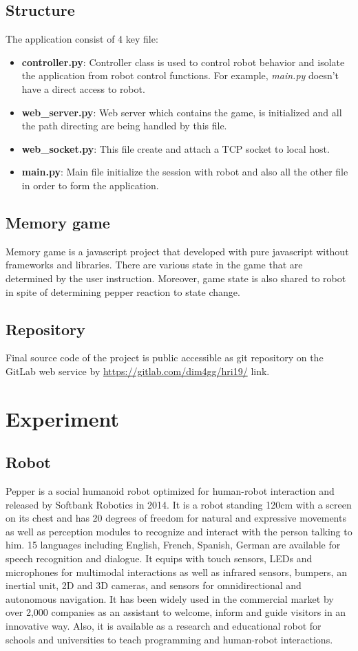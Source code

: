 \documentclass[12pt]{article}
\begin{document}
\subsection{Structure}
The application consist of 4 key file:
\begin{itemize}
\item \textbf{controller.py}: Controller class is used to control robot behavior and isolate the application from robot control functions. For example, \textit{main.py} doesn't have a direct access to robot.
\item \textbf{web\_server.py}: Web server which contains the game, is initialized and all the path directing are being handled by this file.
\item \textbf{web\_socket.py}: This file create and attach a TCP socket to local host.
\item \textbf{main.py}: Main file initialize the session with robot and also all the other file in order to form the application.
\end{itemize}
\subsection{Memory game}
Memory game is a javascript project that developed with pure javascript without frameworks and libraries. There are various state in the game that are determined by the user instruction. Moreover, game state is also shared to robot in spite of determining pepper reaction to state change.
\subsection{Repository}
Final source code of the project is public accessible as git repository on the GitLab web service by \url{https://gitlab.com/dim4gg/hri19/} link.
\newpage
\section{Experiment}
\label{sect_exper}

\subsection{Robot}
Pepper is a social humanoid robot optimized for human-robot interaction and released by Softbank Robotics in 2014. It is a robot standing 120cm with a screen on its chest and has 20 degrees of freedom for natural and expressive movements as well as perception modules to recognize and interact with the person talking to him. 15 languages including English, French, Spanish, German are available  for speech recognition and dialogue. It equips with touch sensors, LEDs and microphones for multimodal interactions as well as infrared sensors, bumpers, an inertial unit, 2D and 3D cameras, and sensors for omnidirectional and autonomous navigation. It has been widely used in the commercial market by over 2,000 companies as an assistant to welcome, inform and guide visitors in an innovative way. Also, it is available as a research and educational robot for schools and universities to teach programming and human-robot interactions. 
\end{document}
